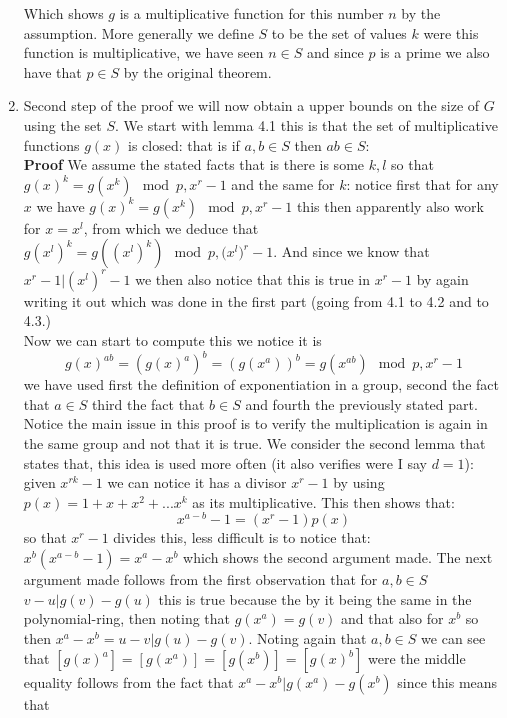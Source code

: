 \documentclass[../Main.tex]{subfiles}
\begin{document}
\begin{enumerate}
\begin{equation}
\end{equation}
Which shows $g$ is a multiplicative function for this number $n$ by the assumption. More generally we define $S$ to be the set of values $k$ were this function is multiplicative, we have seen $n\in S$ and since $p$ is a prime we also have that $p\in S$ by the original theorem.
\item Second step of the proof we will now obtain a upper bounds on the size of $G$ using the set $S$. We start with lemma 4.1 this is that the set of multiplicative functions $g(x)$ is closed: that is if $a,b\in S$ then $ab\in S$:\\
\textbf{Proof} We assume the stated facts that is there is some $k,l$ so that $g(x)^k=g(x^k)\mod{p,x^r-1}$ and the same for $k$: notice first that for any $x$ we have $g(x)^k=g(x^k)\mod{p,x^r-1}$ this then apparently also work for $x=x^l$, from which we deduce that $g(x^l)^k=g((x^l)^k)\mod{p,(x^{l}})^r-1$. And since we know that $x^r-1|(x^l)^r-1$ we then also notice that this is true in $x^r-1$ by again writing it out which was done in the first part (going from 4.1 to 4.2 and to 4.3.)\\
Now we can start to compute this we notice it is 
\begin{equation}
    g(x)^{ab}=(g(x)^a)^b=(g(x^a))^b=g(x^{ab})\mod{p,x^r-1}
\end{equation}
we have used first the definition of exponentiation in a group, second the fact that $a\in S$ third the fact that $b\in S$ and fourth the previously stated part. Notice the main issue in this proof is to verify the multiplication is again in the same group and not that it is true. 
We consider the second lemma that states that, this idea is used more often (it also verifies were I say $d=1$): 
given $x^{rk}-1$ we can notice it has a divisor $x^r-1$ by using $p(x)=1+x+x^2+...x^k$ as its multiplicative. This then shows that:
\begin{equation}
        x^{a-b}-1=(x^r-1)p(x)
\end{equation}
so that $x^r-1$ divides this, less difficult is to notice that: $x^b(x^{a-b}-1)=x^a-x^b$ which shows the second argument made. The next argument made follows from the first observation that for $a,b\in S$ $v-u|g(v)-g(u)$ this is true because the by it being the same in the polynomial-ring, then noting that $g(x^a)=g(v)$ and that also for $x^b$ so then $x^a-x^b=u-v|g(u)-g(v)$. Noting again that $a,b\in S$ we can see that $[g(x)^a]=[g(x^a)]=[g(x^b)]=[g(x)^b]$ were the middle equality follows from the fact that $x^a-x^b|g(x^a)-g(x^b)$ since this means that 

\end{enumerate}
\end{document}

